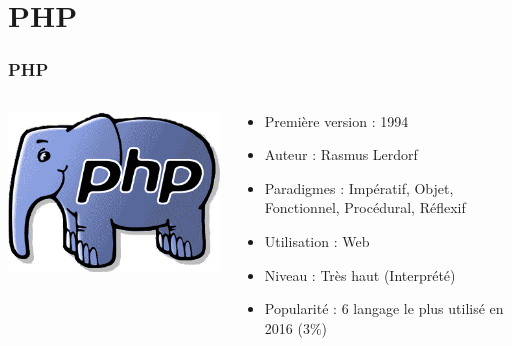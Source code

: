 \documentclass{beamer}
\begin{document}
	\section{PHP}	
	\begin{frame}
	\frametitle{PHP}
		\begin{columns}

	\begin{column}{3cm}
			\includegraphics[scale=0.3]{arton129.png}
	\end{column}

	\begin{column}{7cm}
		\begin{itemize}
			\item Première version : 1994
			\item Auteur : Rasmus Lerdorf
			\item Paradigmes : Impératif, Objet, Fonctionnel, Procédural, Réflexif
			\item Utilisation : Web
			\item Niveau : Très haut (Interprété)
			\item Popularité : 6 langage le plus utilisé en 2016 (3\%)
		\end{itemize}
	\end{column}
	\end{columns}
	
	\end{frame}
	
\end{document}
